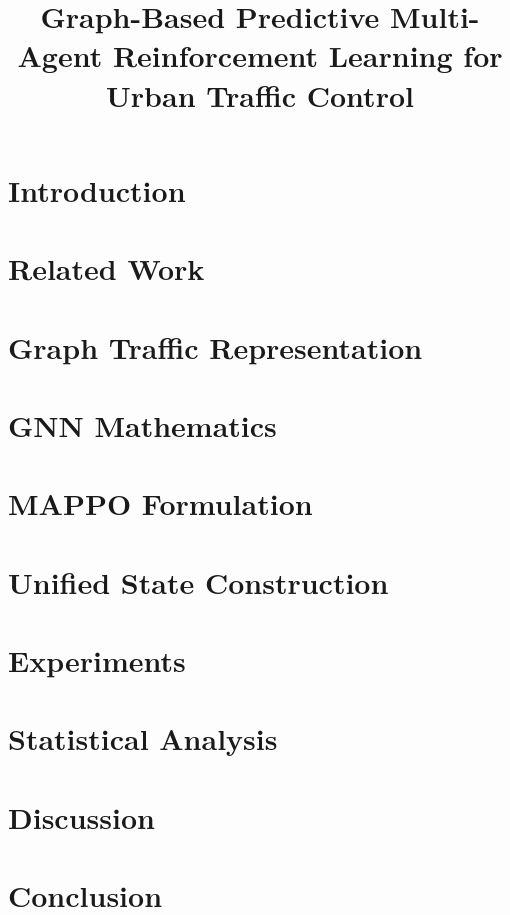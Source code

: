\documentclass{article}
\title{Graph-Based Predictive Multi-Agent Reinforcement Learning for Urban Traffic Control}
\begin{document}
\maketitle

\begin{abstract}
\end{abstract}

\section{Introduction}
\section{Related Work}
\section{Graph Traffic Representation}
\section{GNN Mathematics}
\section{MAPPO Formulation}
\section{Unified State Construction}
\section{Experiments}
\section{Statistical Analysis}
\section{Discussion}
\section{Conclusion}
\end{document}
